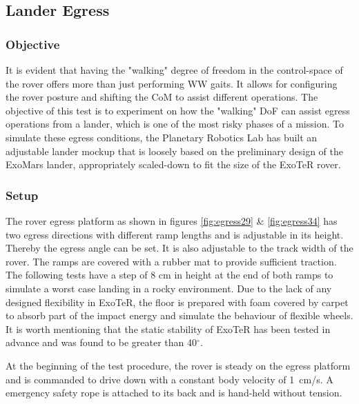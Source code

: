 \documentclass[a4paper,twocolumn]{esapub2005} %
\begin{document}

\subsection{Lander Egress} 

\subsubsection{Objective}
It is evident that having the "walking" degree of freedom in the control-space
of the rover offers more than just performing WW gaits. It allows for
configuring the rover posture and shifting the CoM to assist different
operations. The objective of this test is to experiment on how the "walking"
DoF can assist egress operations from a lander, which is one of the most risky
phases of a mission. To simulate these egress conditions, the Planetary
Robotics Lab has built an adjustable lander mockup that is loosely based on
the preliminary design of the ExoMars lander, appropriately scaled-down to fit
the size of the ExoTeR rover. 

\subsubsection{Setup}
The rover egress platform as shown in figures \ref{fig:egress29} \&
\ref{fig:egress34} has two egress directions with different ramp lengths and is
adjustable in its height. Thereby the egress angle can be set. It is also
adjustable to the track width of the rover. The ramps are covered with a rubber
mat to provide sufficient traction. The following tests have a step of 8 cm in
height at the end of both ramps to simulate a worst case landing in a rocky
environment.  Due to the lack of any designed flexibility in ExoTeR, the floor
is prepared with foam covered by carpet to absorb part of the impact energy and
simulate the behaviour of flexible wheels. It is worth mentioning that the
static stability of ExoTeR has been tested in advance and was found to be greater than
40$^\circ$.

At the beginning of the test procedure, the rover is steady on the egress
platform and is commanded to drive down with a constant body velocity of
1~\unit{cm/s}. A emergency safety rope is attached to its back and is hand-held
without tension. 
\end{document}
